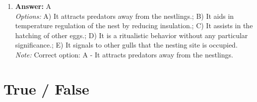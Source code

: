 \documentclass[12pt]{article}
\begin{document}
\begin{enumerate}[label=\arabic*.]
\\ \textit{Note:} Correct option: A - The zygote will not divide into two embryos, producing twins.
\item \textbf{Answer:} A
\\ \textit{Options:} A) It attracts predators away from the nestlings.; B) It aids in temperature regulation of the nest by reducing insulation.; C) It assists in the hatching of other eggs.; D) It is a ritualistic behavior without any particular significance.; E) It signals to other gulls that the nesting site is occupied.
\\ \textit{Note:} Correct option: A - It attracts predators away from the nestlings.
\end{enumerate}

\section*{True / False}
\end{document}
